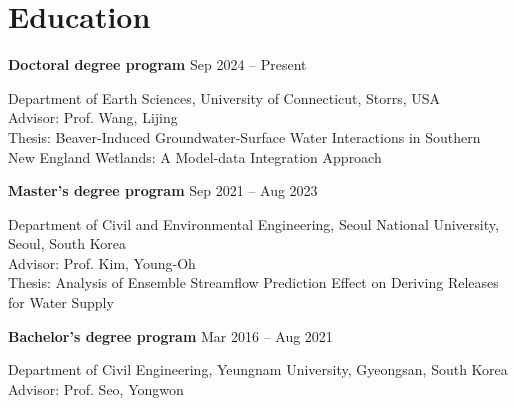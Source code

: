 \renewcommand{\subsection}[3]{
    \noindent\textbf{#1}  \emph{#2} \hfill #3 \break
}

\section{Education}
\subsection{Doctoral degree program}{}{Sep 2024 -- Present}
 Department of Earth Sciences, University of Connecticut, Storrs, USA 
\\ Advisor: Prof. Wang, Lijing
\\ Thesis: Beaver-Induced Groundwater-Surface Water Interactions in Southern New England Wetlands: A Model-data Integration Approach


\subsection{Master's degree program}{}{Sep 2021 -- Aug 2023}
 Department of Civil and Environmental Engineering, Seoul National University, Seoul, South Korea 
\\ Advisor: Prof. Kim, Young-Oh
\\ Thesis: Analysis of Ensemble Streamflow Prediction Effect on Deriving Releases for Water Supply


\subsection{Bachelor's degree program}{}{Mar 2016 -- Aug 2021}
Department of Civil Engineering, Yeungnam University, Gyeongsan, South Korea 
\\ Advisor: Prof. Seo, Yongwon

\vspace{0.2em}